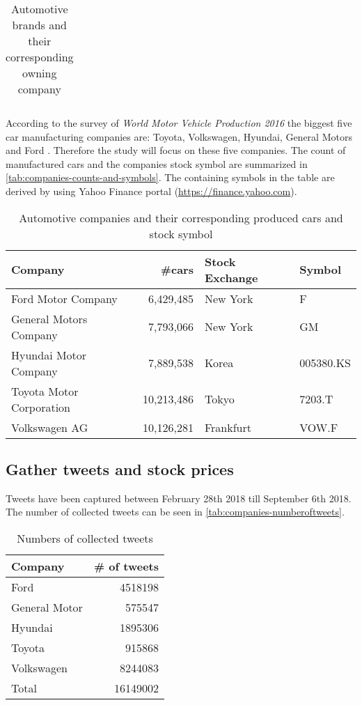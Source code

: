 \begin{longtable}[c]{ll}
  \caption{Automotive brands and their corresponding owning company}
  \label{tab:brands}
  \end{longtable}

According to the survey of \emph{World Motor Vehicle Production 2016} the biggest five car manufacturing companies are: Toyota, Volkswagen, Hyundai, General Motors and Ford \cite{OICA2016}.
Therefore the study will focus on these five companies.
The count of manufactured cars and the companies stock symbol are summarized in \autoref{tab:companies-counts-and-symbols}.
The containing symbols in the table are derived by using Yahoo Finance portal (\url{https://finance.yahoo.com}).

\begin{table}
	\begin{tabular}[c]{lrll}
	  \textbf{Company} & \textbf{\#cars \cite{OICA2016}} & \textbf{Stock Exchange} & \textbf{Symbol}  \\ \hline
	  Ford Motor Company & 6,429,485 & New York \cite{FordMotorCompany2018} & F  \\
	  General Motors Company & 7,793,066 & New York \cite[p.17]{GeneralMotorsCompany2018} & GM \\
	  Hyundai Motor Company & 7,889,538 & Korea \cite[p.92]{HyundaiMotorCompany2016} & 005380.KS \\
	  Toyota Motor Corporation & 10,213,486 & Tokyo \cite{ToyotaMotorCorporation2018} & 7203.T \\
	  Volkswagen AG & 10,126,281 & Frankfurt \cite[p.110]{VolkswagenAktiengesellschaft2017} & VOW.F \\  \hline
	\end{tabular}
	\caption{Automotive companies and their corresponding produced cars and stock symbol}
	\label{tab:companies-counts-and-symbols}
\end{table}

\subsection{Gather tweets and stock prices}

Tweets have been captured between February 28th 2018 till September 6th 2018.
The number of collected tweets can be seen in \autoref{tab:companies-numberoftweets}.

\begin{table}
  \centering
  \begin{tabular}[h]{l r}
  \textbf{Company} & \textbf{\# of tweets} \\ \hline
    Ford & 4518198 \\
    General Motor & 575547 \\
    Hyundai & 1895306 \\
    Toyota & 915868 \\
    Volkswagen & 8244083 \\ \hline
    Total & 16149002 \\ \hline
  \end{tabular}

  \caption{Numbers of collected tweets}
  \label{tab:companies-numberoftweets}
\end{table}


